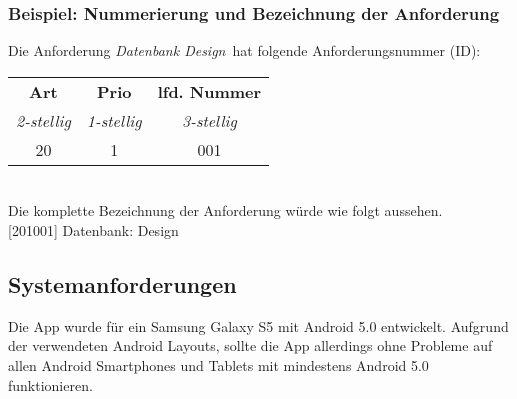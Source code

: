 \subsubsection{Beispiel: Nummerierung und Bezeichnung der Anforderung}

Die Anforderung  \glqq\emph{Datenbank Design}\grqq \ hat folgende Anforderungsnummer (ID):\\

	\begin{tabular}{c|c|c}
		\textbf{Art} & \textbf{Prio} & \textbf{lfd. Nummer} \\
		\emph{2-stellig} & \emph{1-stellig} & \emph{3-stellig} \\ \hline
		20 & 1 & 001 \\
	\end{tabular}\\

Die komplette Bezeichnung der Anforderung würde wie folgt aussehen. \\

[201001] Datenbank: Design

\subsection{Systemanforderungen}

Die App wurde für ein Samsung Galaxy S5 mit Android 5.0 entwickelt. Aufgrund der verwendeten Android Layouts,
 sollte die App allerdings ohne Probleme auf allen Android Smartphones und Tablets mit mindestens Android 5.0 
 funktionieren.